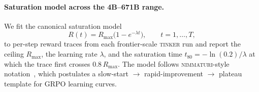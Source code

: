 
\paragraph{Saturation model across the 4B--671B range.}
\label{par:saturation}
We fit the canonical saturation model
\begin{equation}
  \label{eq:sat}
  R(t) = R_{\max}\bigl(1 - e^{-\lambda t}\bigr),
  \qquad t = 1, \dots, T,
\end{equation}
to per-step reward traces from each frontier-scale
\textsc{tinker} run and report the ceiling $R_{\max}$, the
learning rate $\lambda$, and the saturation time
$t_{80} = -\ln(0.2)/\lambda$ at which the trace first crosses
$0.8\,R_{\max}$.  The model follows
\textsc{nimmaturi}-style notation~\citep{nimmaturi2025predictive},
which postulates a slow-start $\to$ rapid-improvement $\to$
plateau template for GRPO learning curves.

